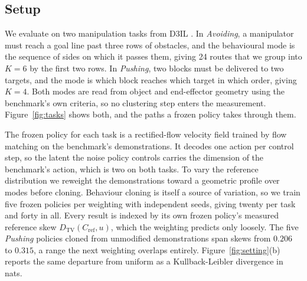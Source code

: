 \documentclass[preprint,12pt]{elsarticle}
\begin{document}
\subsection{Setup}\label{sec:setup}

We evaluate on two manipulation tasks from D3IL \citep{jia2024d3il}. In
\emph{Avoiding}, a manipulator must reach a goal line past three rows of
obstacles, and the behavioural mode is the sequence of sides on which it passes
them, giving 24 routes that we group into $K = 6$ by the first two rows. In
\emph{Pushing}, two blocks must be delivered to two targets, and the mode is
which block reaches which target in which order, giving $K = 4$. Both modes are
read from object and end-effector geometry using the benchmark's own criteria, so
no clustering step enters the measurement. Figure~\ref{fig:tasks} shows both, and
the paths a frozen policy takes through them.

The frozen policy for each task is a rectified-flow velocity field
\citep{liu2022rectifiedflow} trained by flow matching on the benchmark's
demonstrations. It decodes one action per control step, so the latent the noise
policy controls carries the dimension of the benchmark's action, which is two on
both tasks. To vary the reference distribution we reweight the demonstrations
toward a geometric profile over modes before cloning. Behaviour cloning is itself
a source of variation, so we train five frozen policies per weighting with
independent seeds, giving twenty per task and forty in all. Every result is
indexed by its own frozen policy's measured reference skew
$D_{\mathrm{TV}}(C_{\mathrm{ref}}, u)$, which the weighting predicts only
loosely. The five \emph{Pushing} policies cloned from unmodified demonstrations
span skews from $0.206$ to $0.315$, a range the next weighting overlaps
entirely. Figure~\ref{fig:setting}(b) reports the same departure from uniform
as a Kullback-Leibler divergence in nats.
\end{document}
